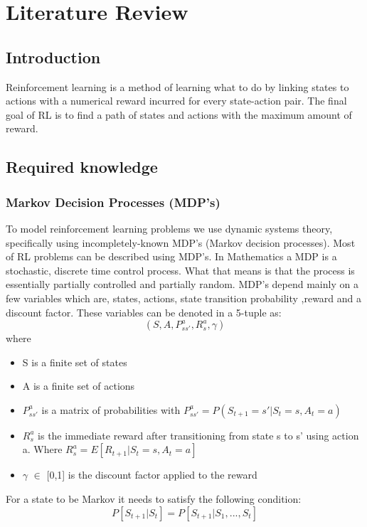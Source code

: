 \graphicspath{{Literature\_Review/fig}}
\chapter{Literature Review}
\label{chap:Literature_Review}

\section{Introduction}
Reinforcement learning is a method of learning what to do by linking states to actions with a numerical reward incurred for every state-action pair. The final goal of RL is to find a path of states and actions with the maximum amount of reward. \cite{sutton_barto}
\section{Required knowledge}
\subsection{Markov Decision Processes (MDP's)}

To model reinforcement learning problems we use dynamic systems theory, specifically using incompletely-known MDP's (Markov decision
processes). Most of RL problems can be described using MDP's. In Mathematics a MDP is a stochastic, discrete time control process. What that means is that the process is essentially partially controlled and partially random. MDP's depend mainly on a few variables which are, states, actions, state transition probability ,reward and a discount factor\cite{sutton_barto}. These variables can be denoted in a 5-tuple as:
\[(S,A,P^{a}_{ss'},R^{a}_{s},\gamma)\] where
\begin{itemize}
	\item S is a finite set of states
	\item A is a finite set of actions
	\item $P^{a}_{ss'}$ is a matrix of probabilities with $P^{a}_{ss'} = P(S_{t+1} = s' | S_t = s,A_t = a) $
	\item $R^{a}_{s}$ is the immediate reward after transitioning from state s to s' using action a. Where $R^{a}_{s} = E[R_{t+1}|S_t =s, A_t =a]$
	\item $\gamma$ $\in$ [0,1] is the discount factor applied to the reward
\end{itemize}

For a state to be Markov it needs to satisfy the following condition:
\[P[S_{t+1}|S_{t}] = P[S_{t+1}|S_{1},...,S_{t}]\]

